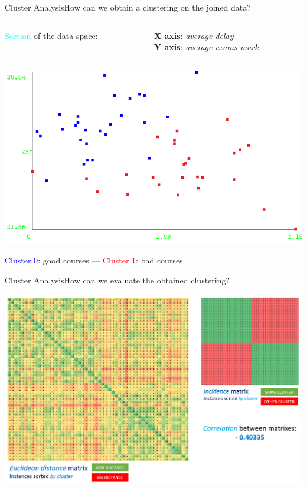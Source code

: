 \begin{frame}{Cluster Analysis}{How can we obtain a clustering on the joined data?}

 \vspace{0.2cm}
\begin{columns}
\begin{column}{0.5\textwidth}
   \textcolor{cyan}{Section} of the data space:
\end{column}
\begin{column}{0.5\textwidth}
     \textbf{X axis}: \emph{average delay} \\ \textbf{Y axis}: \emph{average exams mark}
\end{column}
\end{columns}

    \vspace{0.1cm}
    \begin{centering}
        \hspace{0.5cm}\includegraphics[scale=0.65]{cluster1.png}
    \end{centering}

    \textcolor{blue}{Cluster 0}: good courses --- \textcolor{red}{Cluster 1}: bad courses

\end{frame}

\begin{frame}{Cluster Analysis}{How can we evaluate the obtained clustering?}

\vspace{-0.3cm}
    \begin{centering}
        \hspace{-0.0cm}\includegraphics[scale=0.275]{cluster5.png}
    \end{centering}

\end{frame}
